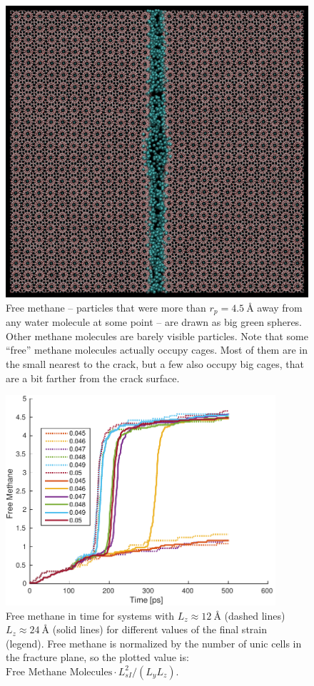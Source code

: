 \begin{figure}
\centering
\includegraphics[width=\textwidth]{../pictures/free_methane.pdf}
\caption{Free methane -- particles that were more than $r_p = \SI{4.5}{\angstrom}$ away from any water molecule at some point -- are drawn as big green spheres. Other methane molecules are barely visible particles. Note that some ``free'' methane molecules actually occupy cages. Most of them are in the small nearest to the crack, but a few also occupy big cages, that are a bit farther from the crack surface. }
\label{fig:free_methane}
\end{figure}

\begin{figure}
\centering
\includegraphics[width=10cm]{../figures/thesis/free_methane_nz1_nz2.pdf}
\caption{Free methane in time for systems with $L_z \approx \SI{12}{\angstrom}$ (dashed lines) $L_z\approx \SI{24}{\angstrom}$ (solid lines) for different values of the final strain (legend). Free methane is normalized by the number of unic cells in the fracture plane, so the plotted value is: $\text{Free Methane Molecules}\cdot L_{sI}^2/(L_yL_z)$.}
\end{figure}

